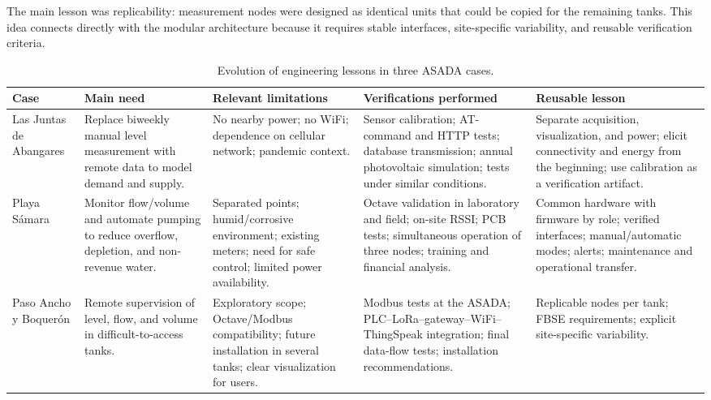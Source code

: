 \documentclass[conference]{IEEEtran}
\begin{document}
The main lesson was replicability: measurement nodes were designed as identical units that could be copied for the remaining tanks. This idea connects directly with the modular architecture because it requires stable interfaces, site-specific variability, and reusable verification criteria.

\begin{table}[t]
\caption{Evolution of engineering lessons in three ASADA cases.}
\label{tab:casos}
\centering
\scriptsize
\begin{tabular}{L{2.6cm} L{3.0cm} L{3.2cm} L{3.5cm} L{3.5cm}}
\hline
Case & Main need & Relevant limitations & Verifications performed & Reusable lesson \\
\hline
Las Juntas de Abangares \cite{Chavarria2021} & Replace biweekly manual level measurement with remote data to model demand and supply. & No nearby power; no WiFi; dependence on cellular network; pandemic context. & Sensor calibration; AT-command and HTTP tests; database transmission; annual photovoltaic simulation; tests under similar conditions. & Separate acquisition, visualization, and power; elicit connectivity and energy from the beginning; use calibration as a verification artifact. \\
Playa Sámara \cite{Solorzano2021} & Monitor flow/volume and automate pumping to reduce overflow, depletion, and non-revenue water. & Separated points; humid/corrosive environment; existing meters; need for safe control; limited power availability. & Octave validation in laboratory and field; on-site RSSI; PCB tests; simultaneous operation of three nodes; training and financial analysis. & Common hardware with firmware by role; verified interfaces; manual/automatic modes; alerts; maintenance and operational transfer. \\
Paso Ancho y Boquerón \cite{Oviedo2024} & Remote supervision of level, flow, and volume in difficult-to-access tanks. & Exploratory scope; Octave/Modbus compatibility; future installation in several tanks; clear visualization for users. & Modbus tests at the ASADA; PLC--LoRa--gateway--WiFi--ThingSpeak integration; final data-flow tests; installation recommendations. & Replicable nodes per tank; FBSE requirements; explicit site-specific variability. \\
\hline
\end{tabular}
\end{table}
\end{document}
